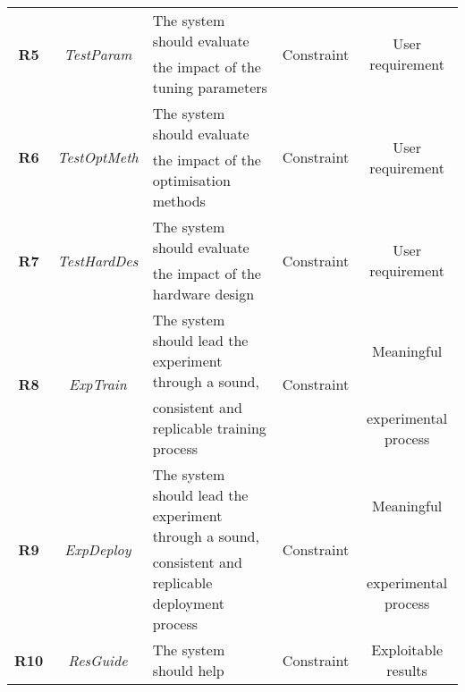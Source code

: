 {\begin{tabular}{| c c l c c |}
\multirow{2}{*}{\textbf{R5}}  & \multirow{2}{*}{\emph{TestParam}}       & The system should evaluate                                             & \multirow{2}{*}{Constraint} & \multirow{2}{*}{User requirement} \\
                              &                                         & the impact of the tuning parameters                                    &                             & \\ \hline
\multirow{2}{*}{\textbf{R6}}  & \multirow{2}{*}{\emph{TestOptMeth}}     & The system should evaluate                                             & \multirow{2}{*}{Constraint} & \multirow{2}{*}{User requirement} \\
                              &                                         & the impact of the optimisation methods                                 &                             & \\ \hline
\multirow{2}{*}{\textbf{R7}}  & \multirow{2}{*}{\emph{TestHardDes}}     & The system should evaluate                                             & \multirow{2}{*}{Constraint} & \multirow{2}{*}{User requirement} \\
                              &                                         & the impact of the hardware design                                      &                             & \\ \hline
\multirow{2}{*}{\textbf{R8}}  & \multirow{2}{*}{\emph{ExpTrain}}        & The system should lead the experiment through a sound,                 & \multirow{2}{*}{Constraint} & Meaningful \\
                              &                                         & consistent and replicable training process                             &                             & experimental process\\\hline
\multirow{2}{*}{\textbf{R9}}  & \multirow{2}{*}{\emph{ExpDeploy}}       & The system should lead the experiment through a sound,                 & \multirow{2}{*}{Constraint} & Meaningful \\
                              &                                         & consistent and replicable deployment process                           &                             & experimental process\\ \hline
\multirow{2}{*}{\textbf{R10}} & \multirow{2}{*}{\emph{ResGuide}}        & The system should help                                                 & \multirow{2}{*}{Constraint} & \multirow{2}{*}{Exploitable results}\\

\end{tabular}}
